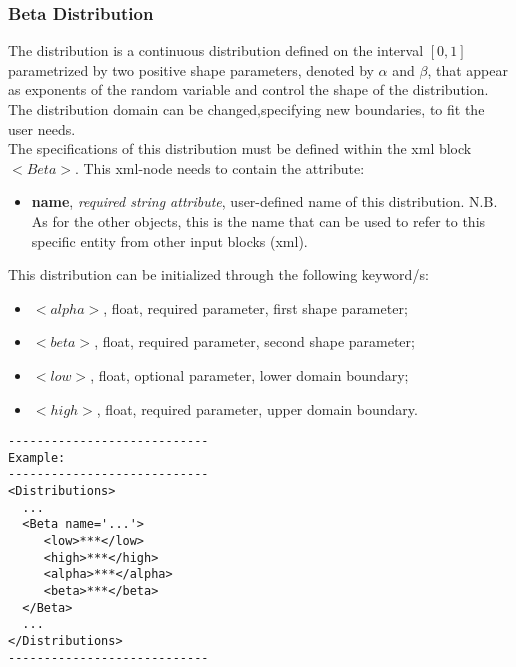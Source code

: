 \subsubsection{Beta Distribution}
\label{subsubsec:Beta}
The  distribution is a continuous distribution  defined on the interval $[0, 1]$ parametrized by two positive shape parameters, denoted by $\alpha$ and $\beta$, that appear as exponents of the random variable and control the shape of the distribution. The distribution domain  can be changed,specifying new boundaries, to fit the user needs.
\\ The specifications of this distribution must be defined within the xml block $<Beta>$. This xml-node needs to contain the attribute:
\vspace{-5mm}
\begin{itemize}
\itemsep0em
\item \textbf{name}, \textit{required string attribute}, user-defined name of this distribution. N.B. As for the other objects, this is the name that can be used to refer to this specific entity from other input blocks (xml).   
\end{itemize}
\vspace{-5mm}
This distribution can be initialized through the following keyword/s:
\begin{itemize}
\item $<alpha>$, float, required parameter, first shape parameter;
\item $<beta>$, float, required parameter, second shape parameter;
\item $<low>$, float, optional parameter,  lower domain boundary;  
\item $<high>$, float, required parameter, upper domain boundary.
\end{itemize}

\begin{lstlisting}[style=XML]
----------------------------
Example:
----------------------------
<Distributions>
  ...
  <Beta name='...'>
     <low>***</low>
     <high>***</high>
     <alpha>***</alpha>
     <beta>***</beta>
  </Beta>
  ...
</Distributions>
----------------------------
\end{lstlisting}

